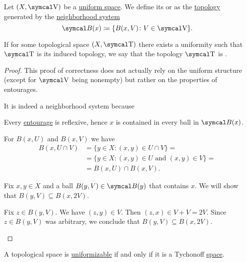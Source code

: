 \begin{Definition}\label{def:uniform_topology}
  Let \( (X, \CV) \) be a \hyperref[def:uniform_space]{uniform space}. We define its  or  as the \hyperref[def:topological_space]{topology} generated by the \hyperref[def:topological_local_base]{neighborhood system}
  \begin{equation*}
    \Cal{B}(x) \coloneqq \{ B(x, V) \colon V \in \CV \}.
  \end{equation*}

  If for some topological space \( (X, \CT) \) there exists a uniformity such that \( \CT \) is its induced topology, we say that the topology \( \CT \) is .
\end{Definition}
\begin{proof}
  This proof of correctness does not actually rely on the uniform structure (except for \( \CV \) being nonempty) but rather on the properties of entourages.

  It is indeed a neighborhood system because
  \begin{RefList}
     Every \hyperref[def:entourage]{entourage} is reflexive, hence \( x \) is contained in every ball in \( \Cal{B}(x) \).

     For \( B(x, U) \) and \( B(x, V) \) we have
    \begin{align*}
      B(x, U \cap V)
      &=
      \{ y \in X \colon (x, y) \in U \cap V \}
      = \\ &=
      \{ y \in X \colon (x, y) \in U \text{ and } (x, y) \in V \}
      = \\ &=
      B(x, U) \cap B(x, V).
    \end{align*}

     Fix \( x, y \in X \) and a ball \( B(y, V) \in \Cal{B}(y) \) that contains \( x \). We will show that \( B(y, V) \subseteq B(x, 2V) \).

    Fix \( z \in B(y, V) \). We have \( (z, y) \in V \). Then \( (z, x) \in V + V = 2V \). Since \( z \in B(y, V) \) was arbitrary, we conclude that \( B(y, V) \subseteq B(x, 2V) \).
  \end{RefList}
\end{proof}

\begin{Theorem}\label{thm:tychonoff_spaces_are_uniformizable}\cite[theorem 8.1.20]{Engelking1989}
  A topological space is \hyperref[def:uniform_topology]{uniformizable} if and only if it is a Tychonoff \hyperref[def:separation_axioms/T3.5]{space}.
\end{Theorem}

